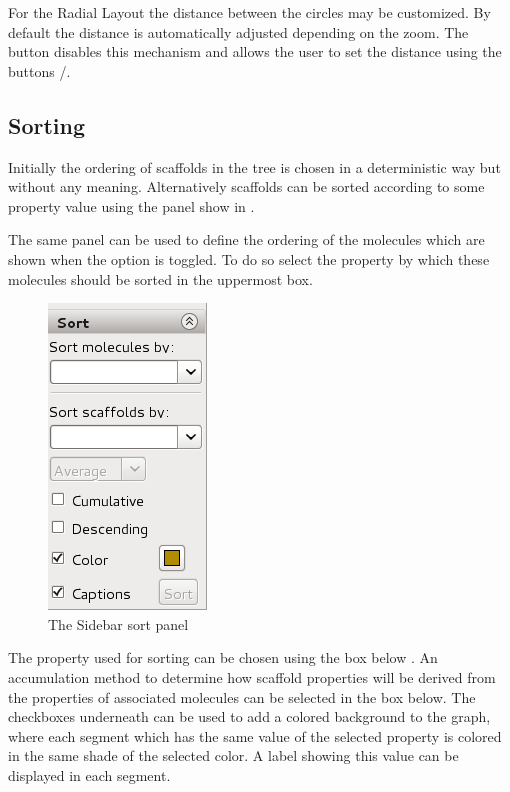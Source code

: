For the Radial Layout the distance between the circles may be customized. By default the
distance is automatically adjusted depending on the zoom. The  button disables this mechanism and allows the user to set the
distance using the buttons /.

\subsection{Sorting}
Initially the ordering of scaffolds in the tree is chosen in a deterministic
way but without any meaning. Alternatively scaffolds can be sorted according to
some property value using the  \sbar panel
show in .

The same panel can be used to define the ordering of the molecules which are
shown when the option  is toggled. To do so select
the property by which these molecules should be sorted in the uppermost box.

\begin{figure}[!htb]
   \centering
   \includegraphics[scale=0.5]{images/stree/sidebar_sort.png}
   \caption{The Sidebar sort panel}
   \label{fig:treeview:sortpanel}
\end{figure}
The property used for sorting can be chosen using the box below . An accumulation method to determine how scaffold
properties will be derived from the properties of associated molecules can be selected in the
box below. The checkboxes underneath can be used to add a colored background to
the graph, where each segment which has the same value of the selected property
is colored in the same shade of the selected color. A label showing this value
can be displayed in each segment.

